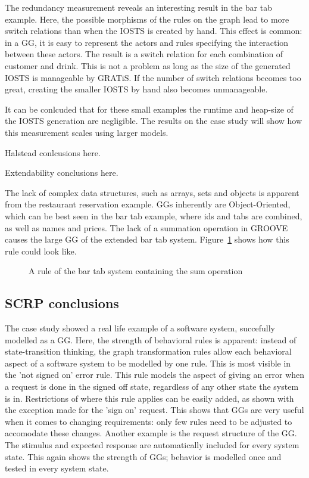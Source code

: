 The redundancy measurement reveals an interesting result in the bar tab example. Here, the possible morphisms of the rules on the graph lead to more switch relations than when the IOSTS is created by hand. This effect is common: in a GG, it is easy to represent the actors and rules specifying the interaction between these actors. The result is a switch relation for each combination of customer and drink. This is not a problem as long as the size of the generated IOSTS is manageable by GRATiS. If the number of switch relations becomes too great, creating the smaller IOSTS by hand also becomes unmanageable.


It can be conlcuded that for these small examples the runtime and heap-size of the IOSTS generation are negligible. The results on the case study will show how this measurement scales using larger models.

Halstead conlcusions here.

Extendability conclusions here.

The lack of complex data structures, such as arrays, sets and objects is apparent from the restaurant reservation example. GGs inherently are Object-Oriented, which can be best seen in the bar tab example, where ids and tabs are combined, as well as names and prices. The lack of a summation operation in GROOVE causes the large GG of the extended bar tab system. Figure~\ref{fig:gg-tab-better} shows how this rule could look like. 

\begin{figure}[ht]
  \begin{center}
    
  \end{center}
  \caption{A rule of the bar tab system containing the sum operation}
  \label{fig:gg-tab-better}
\end{figure}

\subsection{SCRP conclusions}
The case study showed a real life example of a software system, succefully modelled as a GG. Here, the strength of behavioral rules is apparent: instead of state-transition thinking, the graph transformation rules allow each behavioral aspect of a software system to be modelled by one rule. This is most visible in the 'not signed on' error rule. This rule models the aspect of giving an error when a request is done in the signed off state, regardless of any other state the system is in. Restrictions of where this rule applies can be easily added, as shown with the exception made for the 'sign on' request. This shows that GGs are very useful when it comes to changing requirements: only few rules need to be adjusted to accomodate these changes. Another example is the request structure of the GG. The stimulus and expected response are automatically included for every system state. This again shows the strength of GGs; behavior is modelled once and tested in every system state. 

